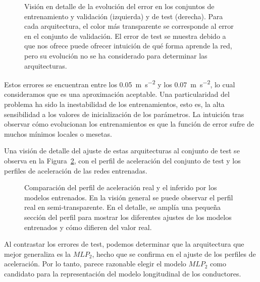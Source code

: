 \begin{figure}
	\centering
	\qquad
	\caption[Evolución del error durante el entrenamiento en las arquitecturas de \acrshort{mlp} para el modelo longitudinal]{Visión en detalle de la evolución del error en los conjuntos de entrenamiento y validación (izquierda) y de test (derecha). Para cada arquitectura, el color más transparente se corresponde al error en el conjunto de validación. El error de test se muestra debido a que nos ofrece puede ofrecer intuición de qué forma aprende la red, pero su evolución no se ha considerado para determinar las arquitecturas.}
	\label{fig:lm-mlp-rmse-all-comparisons}
\end{figure}

Estos errores se encuentran entre los \SI{0.05}{\metre\per\square\second} y los \SI{0.07}{\metre\per\square\second}, lo cual consideramos que es una aproximación aceptable. Una particularidad del problema ha sido la inestabilidad de los entrenamientos, esto es, la alta sensibilidad a los valores de inicialización de los parámetros. La intuición tras observar cómo evolucionan los entrenamientos es que la función de error sufre de muchos mínimos locales o mesetas.

Una visión de detalle del ajuste de estas arquitecturas al conjunto de test se observa en la Figura~\ref{fig:cf-mlp-test-comparisons}, con el perfil de aceleración del conjunto de test y los perfiles de aceleración de las redes entrenadas.

\begin{figure}
	\centering
	\qquad
	\caption[Comparación del perfil de aceleración real y el inferido por los modelos entrenados]{Comparación del perfil de aceleración real y el inferido por los modelos entrenados. En la visión general se puede observar el perfil real en semi-transparente. En el detalle, se amplía una pequeña sección del perfil para mostrar los diferentes ajustes de los modelos entrenados y cómo difieren del valor real.}
	\label{fig:cf-mlp-test-comparisons}
\end{figure}

Al contrastar los errores de test, podemos determinar que la arquitectura que mejor generaliza es la $MLP_2$, hecho que se confirma en el ajuste de los perfiles de aceleración. Por lo tanto, parece razonable elegir el modelo $MLP_2$ como candidato para la representación del modelo longitudinal de los conductores.

